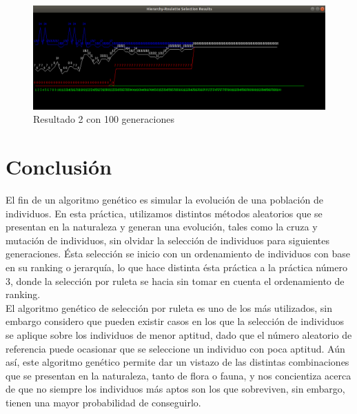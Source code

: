 \documentclass[11pt,letterpaper]{article}
\begin{document}
\begin{figure}[H]
	\centering
	\includegraphics[scale = 0.4]{images/100gen2}
	\caption{Resultado 2 con 100 generaciones}
\end{figure}


\section*{Conclusión}


El fin de un algoritmo genético es simular la evolución de una población de individuos. En esta práctica, utilizamos distintos métodos aleatorios que se presentan en la naturaleza y generan una evolución, tales como la cruza y mutación de individuos, sin olvidar la selección de individuos para siguientes generaciones. Ésta selección se inicio con un ordenamiento de individuos con base en su ranking o jerarquía, lo que hace distinta ésta práctica a la práctica número 3, donde la selección por ruleta se hacia sin tomar en cuenta el ordenamiento de ranking.\\

El algoritmo genético de selección por ruleta es uno de los más utilizados, sin embargo considero que pueden existir casos en los que la selección de individuos se aplique sobre los individuos de menor aptitud, dado que el número aleatorio de referencia puede ocasionar que se seleccione un individuo con poca aptitud. Aún así, este algoritmo genético permite dar un vistazo de las distintas combinaciones que se presentan en la naturaleza, tanto de flora o fauna, y nos concientiza acerca de que no siempre los individuos más aptos son los que sobreviven, sin embargo, tienen una mayor probabilidad de conseguirlo.
\end{document}
